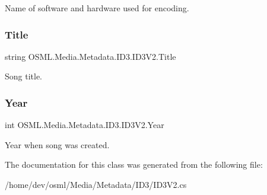 Name of software and hardware used for encoding. 

\mbox{\label{classOSML_1_1Media_1_1Metadata_1_1ID3_1_1ID3V2_abb4a4326c289f867bbb3b144e09caf17}} 
\subsubsection{\texorpdfstring{Title}{Title}}
{\footnotesize\ttfamily string O\+S\+M\+L.\+Media.\+Metadata.\+I\+D3.\+I\+D3\+V2.\+Title\hspace{0.3cm}{\ttfamily [get]}}



Song title. 

\mbox{\label{classOSML_1_1Media_1_1Metadata_1_1ID3_1_1ID3V2_ad128d12ff2045726f105fb89e6630e12}} 
\subsubsection{\texorpdfstring{Year}{Year}}
{\footnotesize\ttfamily int O\+S\+M\+L.\+Media.\+Metadata.\+I\+D3.\+I\+D3\+V2.\+Year\hspace{0.3cm}{\ttfamily [get]}}



Year when song was created. 



The documentation for this class was generated from the following file\+:\begin{DoxyCompactItemize}
\item 
/home/dev/osml/\+Media/\+Metadata/\+I\+D3/I\+D3\+V2.\+cs\end{DoxyCompactItemize}
